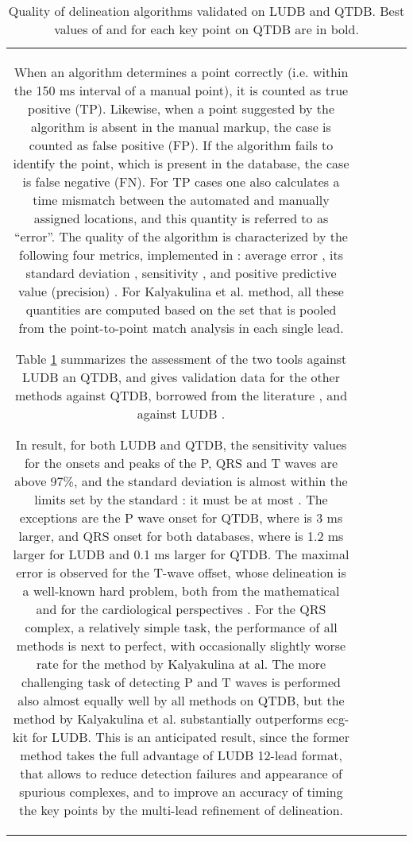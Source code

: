 \documentclass[submitted]{ieeeaccess}
\newcommand{\NewCorrection}[1]{{#1}}
\begin{document}
\begin{table}
\begin{tabular}{|c|c|c|c|c|}
When an algorithm determines a point correctly (i.e. within the 150 ms interval of a manual point), it is counted as true positive (TP). Likewise, when a point suggested by the algorithm is absent in the manual markup, the case is counted as false positive (FP). If the algorithm fails to identify the point, which is present in the database, the case is false negative (FN). For TP cases one also calculates a time mismatch between the automated and manually assigned locations, and this quantity is referred to as ``error''. The quality of the algorithm is characterized by the following four metrics, implemented in \cite{Rincon2011, DiMarco2011, Martinez2004, Bote2017}: average error , its standard deviation , sensitivity , and positive predictive value (precision) . For Kalyakulina et al. method, all these quantities are computed based on the set that is pooled from the point-to-point match analysis in each single lead. 

Table \ref{table6} summarizes the assessment of the two tools \cite{ECGKit,Kalyakulina2018} against LUDB an QTDB, and gives validation data for the other methods against QTDB, borrowed from the literature 
\cite{Martinez2004, Rincon2011, DiMarco2011, Bote2017}, and against LUDB \cite{Chen2020}.

\begin{table*}
	\caption{Quality of delineation algorithms validated on LUDB and QTDB.
             Best values of  and  for each key point on QTDB are in bold.}
	\label{table6}
	\medskip
\begin{adjustbox}{width=1\linewidth}
	
\end{adjustbox}
\end{table*}

In result, for both LUDB and QTDB, the sensitivity values for the onsets and peaks of the P, QRS and T waves are above 97\%, and the standard deviation  is \NewCorrection{almost} within the limits set by the standard \cite{standart1985}: \NewCorrection{it must be at most }. \NewCorrection{The exceptions are the P wave onset for QTDB, where  is 3 ms larger, and QRS onset for both databases, where   is 1.2 ms larger for LUDB and 0.1 ms larger for QTDB}. The maximal error is observed for the T-wave offset, whose delineation is a well-known hard problem, both from the mathematical and for the cardiological perspectives \cite{Mehta2008}. For the QRS complex, a relatively simple task, the performance of all methods is next to perfect, with occasionally slightly worse rate for the method by Kalyakulina at al. The more challenging task of detecting P and T waves is performed also almost equally well by all methods on QTDB, but the method by Kalyakulina et al. substantially outperforms ecg-kit for LUDB. This is an anticipated result, since the former method takes the full advantage of LUDB 12-lead format, that allows to reduce detection failures and appearance of spurious complexes, and to improve an accuracy of timing the key points by the multi-lead refinement of delineation. 


\end{tabular}
\end{table}
\end{document}
